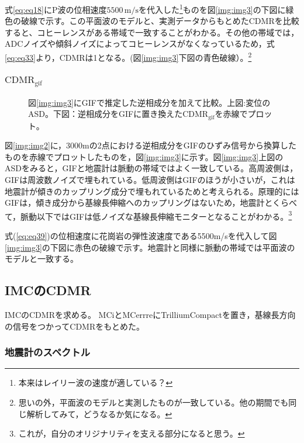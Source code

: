 式\ref{eq:eq18}にP波の位相速度$5500\, \mathrm{m/s}$を代入した\footnote[9]{本来はレイリー波の速度が適している？}ものを図\ref{img:img3}の下図に緑色の破線で示す。この平面波のモデルと、実測データからもとめたCDMRを比較すると、コヒーレンスがある帯域で一致することがわかる。その他の帯域では，ADCノイズや傾斜ノイズによってコヒーレンスがなくなっているため，式\ref{eq:eq33}より，CDMRは1となる。(図\ref{img:img3}下図の青色破線）。\footnote[10]{思いの外，平面波のモデルと実測したものが一致している。他の期間でも同じ解析してみて，どうなるか気になる。}

\subsubsection{$\mathrm{CDMR_{gif}}$}
\begin{figure}[H]
  \begin{center}
  \end{center}
  \caption{図\ref{img:img3}にGIFで推定した逆相成分を加えて比較。上図:変位のASD。下図：逆相成分をGIFに置き換えた$\mathrm{CDMR_{gif}}$を赤線でプロット。
  }\label{img:img4}
\end{figure}


図\ref{img:img2}に，3000mの2点における逆相成分をGIFのひずみ信号から換算したものを赤線でプロットしたものを，図\ref{img:img3}に示す。図\ref{img:img3}上図のASDをみると，GIFと地震計は脈動の帯域ではよく一致している。高周波側は，GIFは周波数ノイズで埋もれている。低周波側はGIFのほうが小さいが，これは地震計が傾きのカップリング成分で埋もれているためと考えられる。原理的にはGIFは，傾き成分から基線長伸縮へのカップリングはないため，地震計とくらべて，脈動以下ではGIFは低ノイズな基線長伸縮モニターとなることがわかる。\footnote[11]{これが，自分のオリジナリティを支える部分になると思う。}

式(\ref{eq:eq39})の位相速度に花崗岩の弾性波速度である5500m/sを代入して図\ref{img:img3}の下図に赤色の破線で示す。地震計と同様に脈動の帯域では平面波のモデルと一致する。


\subsection{IMCのCDMR}
IMCのCDMRを求める。%
MCiとMCerrreにTrilliumCompactを置き，基線長方向の信号をつかってCDMRをもとめた。


\subsubsection{地震計のスペクトル}

